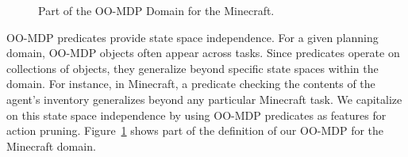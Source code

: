 \documentclass[letterpaper]{article}
\begin{document}
\begin{figure}
%
\caption{Part of the OO-MDP Domain for the Minecraft.\label{fig:oomdp}}
\end{figure}

OO-MDP predicates provide state space independence. For a given
planning domain, OO-MDP objects often appear across tasks. Since
predicates operate on collections of objects, they generalize beyond
specific state spaces within the domain.  For instance, in Minecraft,
a predicate checking the contents of the agent's inventory generalizes
beyond any particular Minecraft task. We capitalize on this state
space independence by using OO-MDP predicates as features for action
pruning.  Figure~\ref{fig:oomdp} shows part of the definition of our
OO-MDP for the Minecraft domain.
\end{document}
